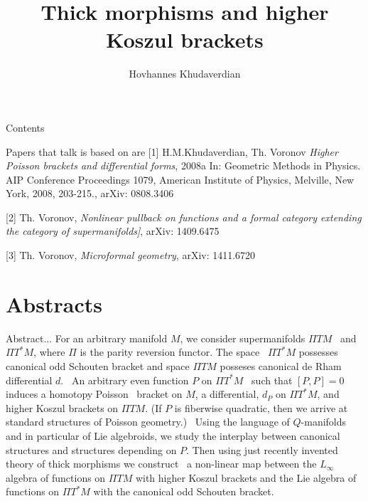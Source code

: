 \documentclass{beamer}
\title[ Higher Koszul brackets and thick] 
{\textbf{Thick morphisms and higher  Koszul brackets}}
\author[Hovhannes Khudaverdian] 
{Hovhannes Khudaverdian }
\institute[University of Manchester, Manchester, UK] 
{University of Manchester, Manchester, UK}
\date{GAP XIV\\
  s\'eminaire itin\'erant ``G\'eom\'etrie et Physique''           \\
 8 August---12 August, Sheffield, UK \\ 

\medskip

{\sl The talk is based on the work with Ted Voronov}

}
\begin{document}
\begin{frame}
  \titlepage
\end{frame}
\begin{frame}{Contents}%
  \tableofcontents
\end{frame}

\begin{frame}{Papers that talk is based on are}
[1] H.M.Khudaverdian, Th. Voronov {\it Higher Poisson 
             brackets and differential forms}, 2008a
 In: Geometric Methods in Physics. AIP Conference Proceedings 1079, 
American Institute of Physics, Melville, New York, 2008, 203-215.,
       arXiv: 0808.3406
\medskip

[2] Th. Voronov, {\it Nonlinear pullback on functions and
a formal category extending the category of supermanifolds]},
          arXiv: 1409.6475

\medskip


[3] Th. Voronov, {\it Microformal geometry},
      arXiv: 1411.6720

\end{frame}


\section {Abstracts}


\begin{frame}{Abstract...}
            For an arbitrary manifold $M$, we consider supermanifolds 
$\Pi TM$  and $\Pi T^*M$, where $\Pi$ is the parity reversion functor.
The space  $\Pi T^*M$ possesses canonical odd Schouten bracket and space 
$\Pi TM$ posseses canonical de Rham differential $d$.  An arbitrary even 
function $P$ on $\Pi T^*M$  such that $[P,P]=0$ induces a 
homotopy Poisson  bracket on $M$, a differential, $d_P$ on $\Pi T^*M$, 
and higher Koszul brackets on $\Pi TM$. (If $P$ is fiberwise quadratic, 
then we arrive at standard structures of Poisson
geometry.)  Using the language of $Q$-manifolds and in particular 
of Lie algebroids, we study the interplay between canonical
structures and structures depending on $P$. Then using just 
recently invented theory of thick morphisms we construct  
a non-linear map between the $L_{\infty}$ algebra of functions 
on $\Pi TM$ with higher Koszul brackets and the Lie algebra of functions 
on $\Pi T^*M$ with the canonical odd Schouten bracket.







\end{frame}
\begin{frame}
\end{frame}
\end{document}
